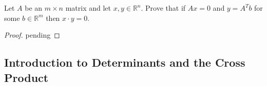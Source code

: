 \begin{exercise} \label{e1.4.29}
    Let \( A \) be an \( m \times n \) matrix and let \( x,y \in \mathbb{R}^n \). Prove that if \( Ax = 0 \) and \( y = A^Tb \) for some \( b \in \mathbb{R}^m \) then \( x \cdot y = 0 \).
    
    \begin{proof}
        pending
    \end{proof}
\end{exercise} %

\subsection{Introduction to Determinants and the Cross Product}